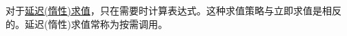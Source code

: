 对于\href{https://en.wikipedia.org/wiki/Lazy_evaluation}{延迟(惰性)求值}，只在需要时计算表达式。这种求值策略与立即求值是相反的。延迟(惰性)求值常称为按需调用。